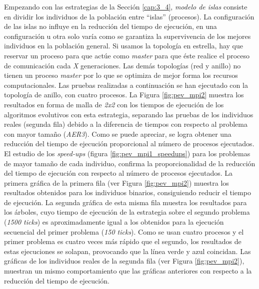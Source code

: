 Empezando con las estrategias de la Sección \ref{cap:3_4}, \textit{modelo de islas} consiste en dividir los individuos de la población entre ``islas'' (procesos). La configuración de las islas no influye en la reducción del tiempo de ejecución, en una configuración u otra solo varía como se garantiza la supervivencia de los mejores individuos en la población general. Si usamos la topología en estrella, hay que reservar un proceso para que actúe como \textit{master} para que éste realice el proceso de comunicación cada \textit{X} generaciones. Las demás topologías (red y anillo) no tienen un proceso \textit{master} por lo que se optimiza de mejor forma los recursos computacionales. Las pruebas realizadas a continuación se han ejecutado con la topología de anillo, con cuatro procesos. La Figura \ref{fig:pev_mpi2} muestra los resultados en forma de malla de \textit{2x2} con los tiempos de ejecución de los algoritmos evolutivos con esta estrategia, separando las pruebas de los individuos reales (segunda fila) debido a la diferencia de tiempos con respecto al problema con mayor tamaño (\textit{AER3}). Como se puede apreciar, se logra obtener una reducción del tiempo de ejecución proporcional al número de procesos ejecutados. El estudio de los \textit{speed-ups} (figura \ref{fig:pev_mpi1_speedups}) para los problemas de mayor tamaño de cada individuo, confirma la proporcionalidad de la reducción del tiempo de ejecución con respecto al número de procesos ejecutados. La primera gráfica de la primera fila (ver Figura \ref{fig:pev_mpi2}) muestra los resultados obtenidos para los individuos binarios, consiguiendo reducir el tiempo de ejecución. La segunda gráfica de esta misma fila muestra los resultados para los árboles, cuyo tiempo de ejecución de la estrategia sobre el segundo problema (\textit{1500 ticks}) es aproximadamente igual a los obtenidos para la ejecución secuencial del primer problema (\textit{150 ticks}). Como se usan cuatro procesos y el primer problema es cuatro veces más rápido que el segundo, los resultados de estas ejecuciones se solapan, provocando que la línea verde y azul coincidan. Las gráficas de los individuos reales de la segunda fila (ver Figura \ref{fig:pev_mpi2}), muestran un mismo comportamiento que las gráficas anteriores con respecto a la reducción del tiempo de ejecución.




